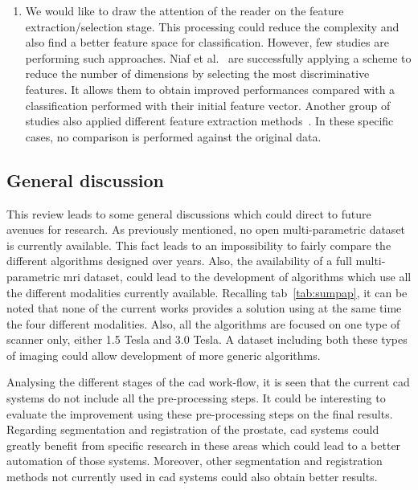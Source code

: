 \begin{enumerate}
\item We would like to draw the attention of the reader on the feature extraction/selection stage. This processing could reduce the complexity and also find a better feature space for classification. However, few studies are performing such approaches. Niaf et al.~\cite{Niaf2011,Niaf2012} are successfully applying a scheme to reduce the number of dimensions by selecting the most discriminative features. It allows them to obtain improved performances compared with a classification performed with their initial feature vector. Another group of studies also applied different feature extraction methods~\cite{Viswanath2008a,Viswanath2008,Viswanath2012,Tiwari2007,Tiwari2008,Tiwari2009,Tiwari2010,Tiwari2012,Tiwari2013}. In these specific cases, no comparison is performed against the original data.
\end{enumerate}

\subsection{General discussion}

This review leads to some general discussions which could direct to future avenues for research. As previously mentioned, no open multi-parametric dataset is currently available. This fact leads to an impossibility to fairly compare the different algorithms designed over years. Also, the availability of a full multi-parametric \ac{mri} dataset, could lead to the development of algorithms which use all the different modalities currently available. Recalling \ac{tab}~\ref{tab:sumpap}, it can be noted that none of the current works provides a solution using at the same time the four different modalities. Also, all the algorithms are focused on one type of scanner only, either 1.5 Tesla and 3.0 Tesla. A dataset including both these types of imaging could allow development of more generic algorithms.

Analysing the different stages of the \ac{cad} work-flow, it is seen that the current \ac{cad} systems do not include all the pre-processing steps. It could be interesting to evaluate the improvement using these pre-processing steps on the final results. Regarding segmentation and registration of the prostate, \ac{cad} systems could greatly benefit from specific research in these areas which could lead to a better automation of those systems. Moreover, other segmentation and registration methods not currently used in \ac{cad} systems could also obtain better results.

